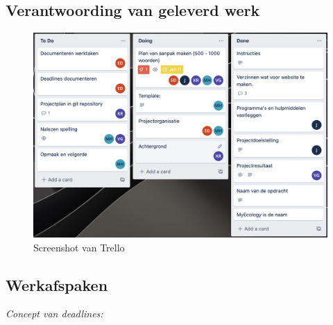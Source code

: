 \documentclass{uva-inf-article}
\begin{document}
\subsection{Verantwoording van geleverd werk}
\begin{figure} [h]
    \centering
    \includegraphics[scale=0.4]{trello.jpg}
    \caption{Screenshot van Trello}
    \label{fig:my_label}
\end{figure}
\break{}
\subsection{Werkafspaken}
\textit{Concept van deadlines:}
\end{document}
